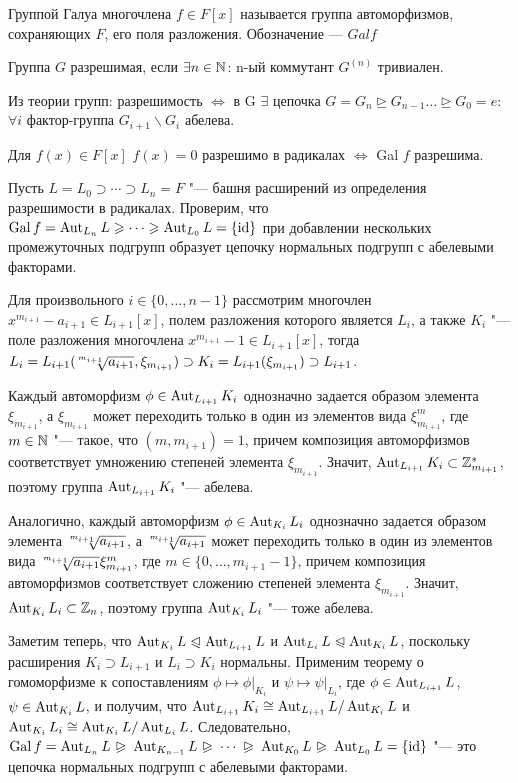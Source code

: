 \Def  Группой Галуа многочлена $f \in F[x]$ называется группа автоморфизмов, сохраняющих $F$, его поля разложения. Обозначение — $Gal f$

\Def Группа $G$ разрешимая, если $\exists n \in \mathbb{N} $: n-ый коммутант $G^{(n)}$ тривиален.

\Note Из теории групп: разрешимость $\Leftrightarrow $ в G $\exists$ цепочка $G = G_n \unrhd G_{n-1} \dots \unrhd G_{0} = e$: $\forall i$ фактор-группа $G_{i+1}\backslash G_i$ абелева.

\Th Для $f(x) \in F[x]$ $f(x) = 0$ разрешимо в радикалах $\Leftrightarrow$ Gal $f$ разрешима.

\Proof 
Пусть $L = L_0 \supset \dotsb \supset L_n = F$ "--- башня расширений из определения разрешимости в радикалах. Проверим, что $\operatorname{Gal}{f} = \operatorname{Aut}_{L_n}{L} \geqslant \dotsb \geqslant \operatorname{Aut}_{L_0}L = \{\operatorname{id}\}$ при добавлении нескольких промежуточных подгрупп образует цепочку нормальных подгрупп с абелевыми факторами.
		
		Для произвольного $i \in \{0, \dotsc, n - 1\}$ рассмотрим многочлен $x^{m_{i+1}} - a_{i+1} \in L_{i + 1}[x]$, полем разложения которого является $L_i$, а также $K_i$ "--- поле разложения многочлена $x^{m_{i+1}} - 1 \in L_{i + 1}[x]$, тогда $L_i = L_{i + 1}(\sqrt[\leftroot{2}\uproot{4}m_{i+1}]{a_{i+1}}, \xi_{m_{i+1}}) \supset K_i = L_{i + 1}(\xi_{m_{i+1}}) \supset L_{i + 1}$.
		
		Каждый автоморфизм $\phi \in \operatorname{Aut}_{L_{i+1}}K_i$ однозначно задается образом элемента $\xi_{m_{i+1}}$, а $\xi_{m_{i+1}}$ может переходить только в один из элементов вида $\xi_{m_{i+1}}^m$, где $m \in \mathbb{N}$ "--- такое, что $(m, {m_{i+1}}) = 1$, причем композиция автоморфизмов соответствует умножению степеней элемента $\xi_{m_{i+1}}$. Значит, $\operatorname{Aut}_{L_{i+1}}K_i \subset \mathbb{Z}_{m_{i+1}}^*$, поэтому группа $\operatorname{Aut}_{L_{i+1}}K_i$ "--- абелева.
		
		Аналогично, каждый автоморфизм $\phi \in \operatorname{Aut}_{K_i}L_i$ однозначно задается образом элемента $\sqrt[\leftroot{2}\uproot{4}m_{i+1}]{a_{i+1}}$, а $\sqrt[\leftroot{2}\uproot{4}m_{i+1}]{a_{i+1}}$ может переходить только в один из элементов вида $\sqrt[\leftroot{2}\uproot{4}m_{i+1}]{a_{i+1}}\xi_{m_{i+1}}^m$, где $m \in \{0, \dotsc, m_{i+1} - 1\}$, причем композиция автоморфизмов соответствует сложению степеней элемента $\xi_{m_{i+1}}$. Значит, $\operatorname{Aut}_{K_i}L_i \subset \mathbb{Z}_n$, поэтому группа $\operatorname{Aut}_{K_i}L_i$ "--- тоже абелева.
		
		Заметим теперь, что $\operatorname{Aut}_{K_i}L \trianglelefteqslant \operatorname{Aut}_{L_{i + 1}}L$ и $\operatorname{Aut}_{L_{i}}L \trianglelefteqslant \operatorname{Aut}_{K_i}L$, поскольку расширения $K_i \supset L_{i+1}$ и $L_i \supset K_i$ нормальны. Применим теорему о гомоморфизме к сопоставлениям $\phi \mapsto \phi|_{K_i}$ и $\psi \mapsto \psi|_{L_i}$, где $\phi \in \operatorname{Aut}_{L_{i + 1}}L$, $\psi \in \operatorname{Aut}_{K_i}L$, и получим, что $\Aut_{L_{i+1}}K_i \hm\cong \Aut_{L_{i + 1}}L / \Aut_{K_i}L$ и $\operatorname{Aut}_{K_i}L_i \cong \operatorname{Aut}_{K_i}L / \operatorname{Aut}_{L_i}L$. Следовательно, $\Gal{f} = \Aut_{L_n}{L} \varnormal \Aut_{K_{n-1}}L \varnormal \dotsb \varnormal \Aut_{K_0}L \varnormal \Aut_{L_0}L = \{\id\}$ "--- это цепочка нормальных подгрупп с абелевыми факторами.
		
\EndProof